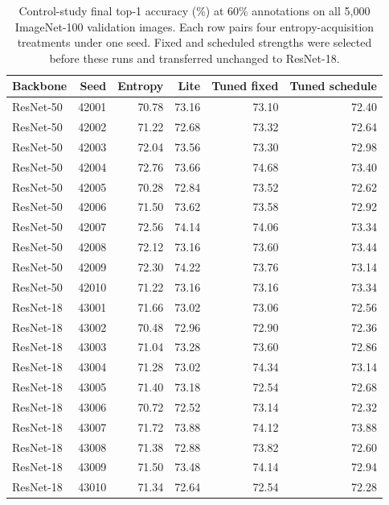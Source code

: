 \documentclass[10pt,a4paper,twocolumn]{article}
\begin{document}
\begin{table}[tbp]
\caption{Control-study final top-1 accuracy (\%) at 60\% annotations
on all 5,000 ImageNet-100 validation images. Each row pairs four entropy-acquisition
treatments under one seed. Fixed and scheduled strengths were selected
before these runs and transferred unchanged to ResNet-18.}
\label{tab:feedback_seeds}
\centering\small
\begin{tabular*}{\textwidth}{@{\extracolsep{\fill}}lrrrrr@{}}
\toprule
Backbone & Seed & Entropy & Lite & Tuned fixed & Tuned schedule \\
\midrule
ResNet-50 & 42001 & 70.78 & 73.16 & 73.10 & 72.40 \\
ResNet-50 & 42002 & 71.22 & 72.68 & 73.32 & 72.64 \\
ResNet-50 & 42003 & 72.04 & 73.56 & 73.30 & 72.98 \\
ResNet-50 & 42004 & 72.76 & 73.66 & 74.68 & 73.40 \\
ResNet-50 & 42005 & 70.28 & 72.84 & 73.52 & 72.62 \\
ResNet-50 & 42006 & 71.50 & 73.62 & 73.58 & 72.92 \\
ResNet-50 & 42007 & 72.56 & 74.14 & 74.06 & 73.34 \\
ResNet-50 & 42008 & 72.12 & 73.16 & 73.60 & 73.44 \\
ResNet-50 & 42009 & 72.30 & 74.22 & 73.76 & 73.14 \\
ResNet-50 & 42010 & 71.22 & 73.16 & 73.16 & 73.34 \\
ResNet-18 & 43001 & 71.66 & 73.02 & 73.06 & 72.56 \\
ResNet-18 & 43002 & 70.48 & 72.96 & 72.90 & 72.36 \\
ResNet-18 & 43003 & 71.04 & 73.28 & 73.60 & 72.86 \\
ResNet-18 & 43004 & 71.28 & 73.02 & 74.34 & 73.14 \\
ResNet-18 & 43005 & 71.40 & 73.18 & 72.54 & 72.68 \\
ResNet-18 & 43006 & 70.72 & 72.52 & 73.14 & 72.32 \\
ResNet-18 & 43007 & 71.72 & 73.88 & 74.12 & 73.88 \\
ResNet-18 & 43008 & 71.38 & 72.88 & 73.82 & 72.60 \\
ResNet-18 & 43009 & 71.50 & 73.48 & 74.14 & 72.94 \\
ResNet-18 & 43010 & 71.34 & 72.64 & 72.54 & 72.28 \\
\bottomrule
\end{tabular*}
\end{table}
\end{document}
